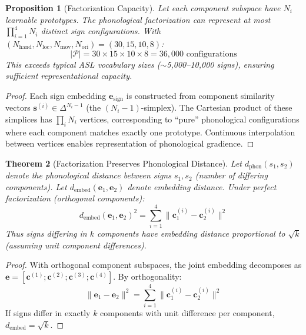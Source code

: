 \documentclass[sigconf,nonacm,anonymous]{acmart}
\newtheorem{theorem}{Theorem}[section]
\newtheorem{proposition}[theorem]{Proposition}
\theoremstyle{definition}
\theoremstyle{remark}
\begin{document}
\begin{proposition}[Factorization Capacity]
\label{prop:capacity}
Let each component subspace have $N_i$ learnable prototypes. The phonological factorization can represent at most $\prod_{i=1}^{4} N_i$ distinct sign configurations. With $(N_{\text{hand}}, N_{\text{loc}}, N_{\text{mov}}, N_{\text{ori}}) = (30, 15, 10, 8)$:
\begin{equation}
|\mathcal{P}| = 30 \times 15 \times 10 \times 8 = 36,000 \text{ configurations}
\end{equation}
This exceeds typical ASL vocabulary sizes ($\sim$5,000--10,000 signs), ensuring sufficient representational capacity.
\end{proposition}

\begin{proof}
Each sign embedding $\mathbf{e}_{\text{sign}}$ is constructed from component similarity vectors $\mathbf{s}^{(i)} \in \Delta^{N_i-1}$ (the $(N_i-1)$-simplex). The Cartesian product of these simplices has $\prod_i N_i$ vertices, corresponding to ``pure'' phonological configurations where each component matches exactly one prototype. Continuous interpolation between vertices enables representation of phonological gradience.
\end{proof}

\begin{theorem}[Factorization Preserves Phonological Distance]
\label{thm:distance}
Let $d_{\text{phon}}(s_1, s_2)$ denote the phonological distance between signs $s_1, s_2$ (number of differing components). Let $d_{\text{embed}}(\mathbf{e}_1, \mathbf{e}_2)$ denote embedding distance. Under perfect factorization (orthogonal components):
\begin{equation}
d_{\text{embed}}(\mathbf{e}_1, \mathbf{e}_2)^2 = \sum_{i=1}^{4} \|\mathbf{c}_1^{(i)} - \mathbf{c}_2^{(i)}\|^2
\end{equation}
Thus signs differing in $k$ components have embedding distance proportional to $\sqrt{k}$ (assuming unit component differences).
\end{theorem}

\begin{proof}
With orthogonal component subspaces, the joint embedding decomposes as $\mathbf{e} = [\mathbf{c}^{(1)}; \mathbf{c}^{(2)}; \mathbf{c}^{(3)}; \mathbf{c}^{(4)}]$. By orthogonality:
\begin{equation}
\|\mathbf{e}_1 - \mathbf{e}_2\|^2 = \sum_{i=1}^{4} \|\mathbf{c}_1^{(i)} - \mathbf{c}_2^{(i)}\|^2
\end{equation}
If signs differ in exactly $k$ components with unit difference per component, $d_{\text{embed}} = \sqrt{k}$.
\end{proof}
\end{document}
